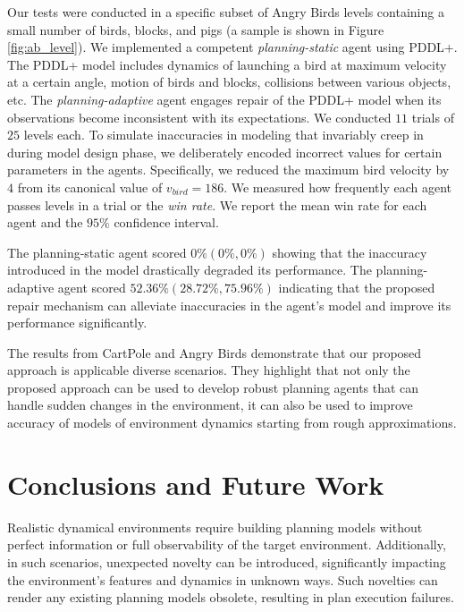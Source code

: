 \documentclass[letterpaper]{article} %
\begin{document}
Our tests were conducted in a specific subset of Angry Birds levels containing a small number of birds, blocks, and pigs (a sample is shown in Figure \ref{fig:ab_level}). We implemented a competent \emph{planning-static} agent using PDDL+. The PDDL+ model includes dynamics of launching a bird at maximum velocity at a certain angle, motion of birds and blocks, collisions between various objects, etc. The \emph{planning-adaptive} agent engages repair of the PDDL+ model when its observations become inconsistent with its expectations. We conducted $11$ trials of $25$ levels each. To simulate inaccuracies in modeling that invariably creep in during model design phase, we deliberately encoded incorrect values for certain parameters in the agents. Specifically, we reduced the maximum bird velocity by $4$ from its canonical value of $v_{bird}=186$. We measured how frequently each agent passes levels in a trial or the \emph{win rate}.
We report the mean win rate for each agent and the $95\%$ confidence interval.

The planning-static agent scored $0\% (0\%, 0\%)$ showing that the inaccuracy introduced in the model drastically degraded its performance. The planning-adaptive agent scored $52.36\% (28.72\%, 75.96\%)$ indicating that the proposed repair mechanism can alleviate inaccuracies in the agent's model and improve its performance significantly.


The results from CartPole and Angry Birds demonstrate that our proposed approach is applicable diverse scenarios. They highlight that not only the proposed approach can be used to develop robust planning agents that can handle sudden changes in the environment, it can also be used to improve accuracy of models of environment dynamics starting from rough approximations.

\section{Conclusions and Future Work}
Realistic dynamical environments require building planning models without perfect information or full observability of the target environment. Additionally, in such scenarios, unexpected novelty can be introduced, significantly impacting the environment's features and dynamics in unknown ways. Such novelties can render any existing planning models obsolete, resulting in plan execution failures.
\end{document}
